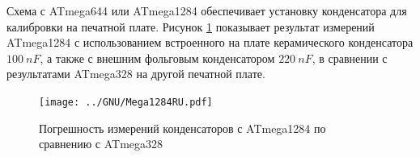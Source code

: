 Схема с ATmega644 или ATmega1284 обеспечивает установку конденсатора для калибровки на печатной плате.
Рисунок \ref{fig:Mega1284} показывает результат измерений ATmega1284 с использованием 
встроенного на плате керамического конденсатора \(100~nF\), а также с внешним фольговым конденсатором \(220~nF\), 
в сравнении с результатами ATmega328 на другой печатной плате.

\begin{figure}[H]
\centering
\texttt{[image: ../GNU/Mega1284RU.pdf]}
\caption{Погрешность измерений конденсаторов с ATmega1284 по сравнению с ATmega328}
\label{fig:Mega1284}
\end{figure}
